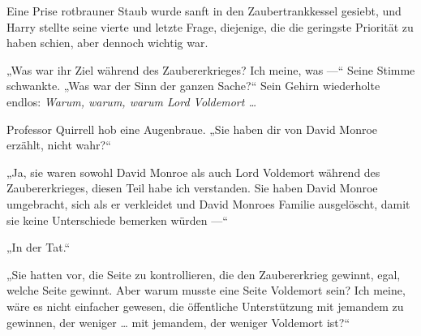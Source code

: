 Eine Prise rotbrauner Staub wurde sanft in den Zaubertrankkessel gesiebt, und Harry stellte seine vierte und letzte Frage, diejenige, die die geringste Priorität zu haben schien, aber dennoch wichtig war.

„Was war ihr Ziel während des Zaubererkrieges? Ich meine, was —“
Seine Stimme schwankte.
„Was war der Sinn der ganzen Sache?“
Sein Gehirn wiederholte endlos: \emph{Warum, warum, warum Lord Voldemort …}

Professor Quirrell hob eine Augenbraue.
„Sie haben dir von David Monroe erzählt, nicht wahr?“

„Ja, sie waren sowohl David Monroe als auch Lord Voldemort während des Zaubererkrieges, diesen Teil habe ich verstanden. Sie haben David Monroe umgebracht, sich als er verkleidet und David Monroes Familie ausgelöscht, damit sie keine Unterschiede bemerken würden —“

„In der Tat.“

„Sie hatten vor, die Seite zu kontrollieren, die den Zaubererkrieg gewinnt, egal, welche Seite gewinnt. Aber warum musste eine Seite Voldemort sein? Ich meine, wäre es nicht einfacher gewesen, die öffentliche Unterstützung mit jemandem zu gewinnen, der weniger … mit jemandem, der weniger Voldemort ist?“

